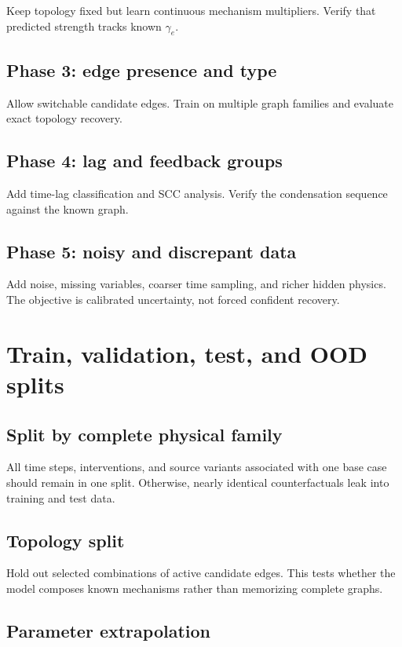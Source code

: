 \documentclass[11pt]{article}
\begin{document}
Keep topology fixed but learn continuous mechanism multipliers. Verify that predicted strength tracks known \(\gamma_e\).

\subsection{Phase 3: edge presence and type}

Allow switchable candidate edges. Train on multiple graph families and evaluate exact topology recovery.

\subsection{Phase 4: lag and feedback groups}

Add time-lag classification and SCC analysis. Verify the condensation sequence against the known graph.

\subsection{Phase 5: noisy and discrepant data}

Add noise, missing variables, coarser time sampling, and richer hidden physics. The objective is calibrated uncertainty, not forced confident recovery.

\section{Train, validation, test, and OOD splits}

\subsection{Split by complete physical family}

All time steps, interventions, and source variants associated with one base case should remain in one split. Otherwise, nearly identical counterfactuals leak into training and test data.

\subsection{Topology split}

Hold out selected combinations of active candidate edges. This tests whether the model composes known mechanisms rather than memorizing complete graphs.

\subsection{Parameter extrapolation}
\end{document}
